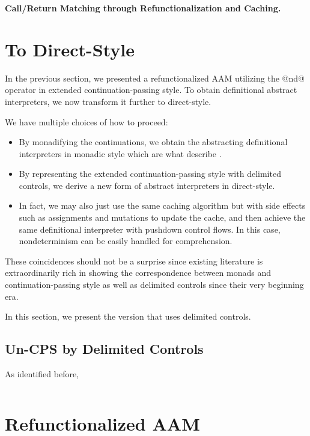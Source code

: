 \documentclass[acmsmall,review,anonymous]{acmart}\settopmatter{printfolios=true,printccs=false,printacmref=false}
\begin{document}
\textbf{Call/Return Matching through Refunctionalization and Caching.}

\section{To Direct-Style} \label{directstyle}

In the previous section, we presented a refunctionalized AAM utilizing the @nd@ operator
in extended continuation-passing style.
To obtain definitional abstract interpreters, we now transform it further to direct-style.

We have multiple choices of how to proceed:
\begin{itemize}
  \item By monadifying the continuations, we obtain the abstracting
    definitional interpreters in monadic style which are what \citeauthor{darais2017abstracting}
    describe \cite{darais2017abstracting}.
  \item By representing the extended continuation-passing style with delimited controls,
    we derive a new form of abstract interpreters in direct-style.
  \item In fact, we may also just use the same caching algorithm but with side effects such as
    assignments and mutations to update the cache, and then achieve the same
    definitional interpreter with pushdown control flows. In this case, nondeterminism can be
    easily handled for comprehension.
\end{itemize}

These coincidences should not be a surprise since existing literature is extraordinarily rich
in showing the correspondence between monads and continuation-passing style as well as
delimited controls since their very beginning era. 

In this section, we present the version that uses delimited controls.

\subsection{Un-CPS by Delimited Controls} \label{uncps}

As identified before, 

\begin{lstlisting}
\end{lstlisting}

\section{Refunctionalized AAM}
\end{document}
